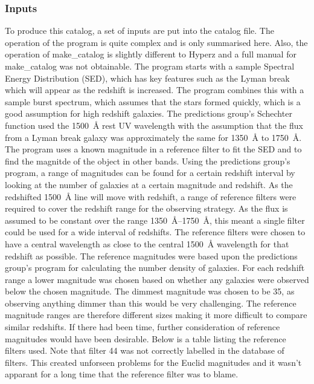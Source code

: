         \subsubsection{Inputs} %
        \label{subsub:Hyperz_inputs}
			To produce this catalog, a set of inputs are put into the catalog file. The operation of the program is quite complex and is only summarised here. Also, the operation of make\_catalog is slightly different to Hyperz and a full manual for make\_catalog was not obtainable. The program starts with a sample Spectral Energy Distribution (SED), which has key features such as the Lyman break which will appear as the redshift is increased. The program combines this with a sample burst spectrum, which assumes that the stars formed quickly, which is a good assumption for high redshift galaxies\cite{hyperz}. The predictions group's Schechter function used the \SI{1500}{\angstrom} rest UV wavelength with the assumption that the flux from a Lyman break galaxy was approximately the same for \SI{1350}{\angstrom} to \SI{1750}{\angstrom}. The program uses a known magnitude in a reference filter to fit the SED and to find the magnitde of the object in other bands. Using the predictions group's program, a range of magnitudes can be found for a certain redshift interval by looking at the number of galaxies at a certain magnitude and redshift. As the redshifted \SI{1500}{\angstrom} line will move with redshift, a range of reference filters were required to cover the redshift range for the observing strategy. As the flux is assumed to be constant over the range \SI{1350}{\angstrom}--\SI{1750}{\angstrom}, this meant a single filter could be used for a wide interval of redshifts. The reference filters were chosen to have a central wavelength as close to the central \SI{1500}{\angstrom} wavelength for that redshift as possible. The reference magnitudes were based upon the predictions group's program for calculating the number density of galaxies. For each redshift range a lower magnitude was chosen based on whether any galaxies were observed below the chosen magnitude. The dimmest magnitude was chosen to be 35, as observing anything dimmer than this would be very challenging. The reference magnitude ranges are therefore different sizes making it more difficult to compare similar redshifts. If there had been time, further consideration of reference magnitudes would have been desirable. Below is a table listing the reference filters used. Note that filter 44 was not correctly labelled in the database of filters. This created unforseen problems for the Euclid magnitudes and it wasn't apparant for a long time that the reference filter was to blame.
